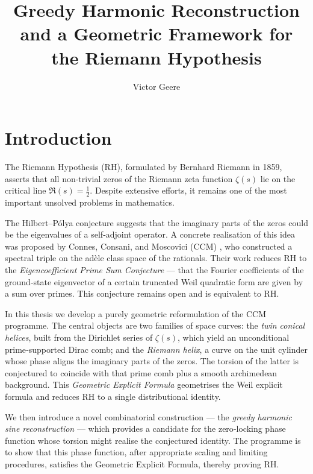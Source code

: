 \documentclass[12pt,a4paper,oneside]{book}
\title{\bf Greedy Harmonic Reconstruction and a Geometric Framework for the Riemann Hypothesis}
\author{Victor Geere}
\date{}
\begin{document}
\maketitle

\tableofcontents

\chapter{Introduction}

The Riemann Hypothesis (RH), formulated by Bernhard Riemann in 1859, asserts that all non‑trivial zeros of the Riemann zeta function \(\zeta(s)\) lie on the critical line \(\Re(s)=\frac12\).  Despite extensive efforts, it remains one of the most important unsolved problems in mathematics.

The Hilbert–P\'olya conjecture suggests that the imaginary parts of the zeros could be the eigenvalues of a self‑adjoint operator.  A concrete realisation of this idea was proposed by Connes, Consani, and Moscovici (CCM) \cite{CCM}, who constructed a spectral triple on the adèle class space of the rationals.  Their work reduces RH to the \emph{Eigencoefficient Prime Sum Conjecture} — that the Fourier coefficients of the ground‑state eigenvector of a certain truncated Weil quadratic form are given by a sum over primes.  This conjecture remains open and is equivalent to RH.

In this thesis we develop a purely geometric reformulation of the CCM programme.  The central objects are two families of space curves: the \emph{twin conical helices}, built from the Dirichlet series of \(\zeta(s)\), which yield an unconditional prime‑supported Dirac comb; and the \emph{Riemann helix}, a curve on the unit cylinder whose phase aligns the imaginary parts of the zeros.  The torsion of the latter is conjectured to coincide with that prime comb plus a smooth archimedean background.  This \emph{Geometric Explicit Formula} geometrises the Weil explicit formula and reduces RH to a single distributional identity.

We then introduce a novel combinatorial construction — the \emph{greedy harmonic sine reconstruction} — which provides a candidate for the zero‑locking phase function whose torsion might realise the conjectured identity.  The programme is to show that this phase function, after appropriate scaling and limiting procedures, satisfies the Geometric Explicit Formula, thereby proving RH.
\end{document}
